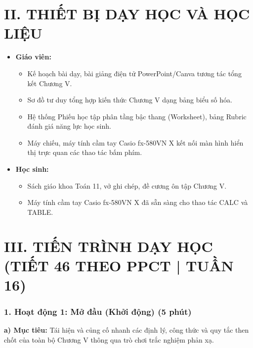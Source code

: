 \documentclass[12pt, a4paper]{article}
\begin{document}
\section*{II. THIẾT BỊ DẠY HỌC VÀ HỌC LIỆU}

\begin{itemize}[leftmargin=1.2cm]
    \item \textbf{Giáo viên:}
    \begin{itemize}[leftmargin=0.6cm]
        \item Kế hoạch bài dạy, bài giảng điện tử PowerPoint/Canva tương tác tổng kết Chương V.
        \item Sơ đồ tư duy tổng hợp kiến thức Chương V dạng bảng biểu số hóa.
        \item Hệ thống Phiếu học tập phân tầng bậc thang (Worksheet), bảng Rubric đánh giá năng lực học sinh.
        \item Máy chiếu, máy tính cầm tay Casio fx-580VN X kết nối màn hình hiển thị trực quan các thao tác bấm phím.
    \end{itemize}
    \item \textbf{Học sinh:}
    \begin{itemize}[leftmargin=0.6cm]
        \item Sách giáo khoa Toán 11, vở ghi chép, đề cương ôn tập Chương V.
        \item Máy tính cầm tay Casio fx-580VN X đã sẵn sàng cho thao tác CALC và TABLE.
    \end{itemize}
\end{itemize}

\section*{III. TIẾN TRÌNH DẠY HỌC (TIẾT 46 THEO PPCT | TUẦN 16)}

\subsubsection*{1. Hoạt động 1: Mở đầu (Khởi động) (5 phút)}

\noindent \textbf{a) Mục tiêu:}
Tái hiện và củng cố nhanh các định lý, công thức và quy tắc then chốt của toàn bộ Chương V thông qua trò chơi trắc nghiệm phản xạ.
\end{document}

